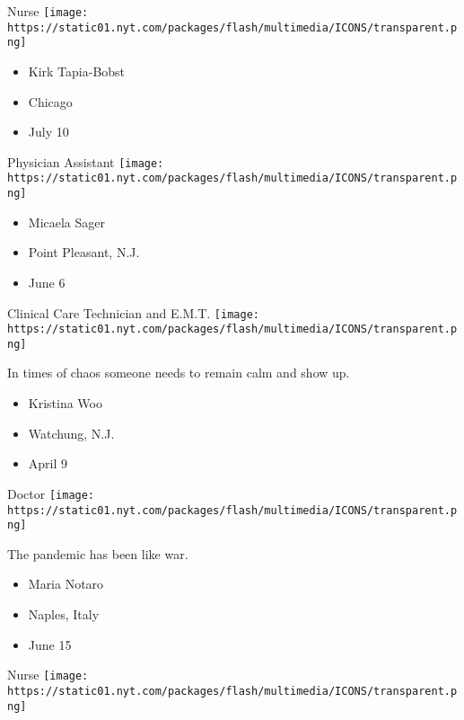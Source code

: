 \protect\hyperlink{item-kirk-tapia-bobst}{}

Nurse
\texttt{[image: https://static01.nyt.com/packages/flash/multimedia/ICONS/transparent.png]}

\begin{itemize}
\tightlist
\item
  Kirk Tapia-Bobst
\item
  Chicago
\item
  July 10
\end{itemize}

\protect\hyperlink{item-micaela-sager}{}

Physician Assistant
\texttt{[image: https://static01.nyt.com/packages/flash/multimedia/ICONS/transparent.png]}

\begin{itemize}
\tightlist
\item
  Micaela Sager
\item
  Point Pleasant, N.J.
\item
  June 6
\end{itemize}

\protect\hyperlink{item-kristina-woo}{}

Clinical Care Technician and E.M.T.
\texttt{[image: https://static01.nyt.com/packages/flash/multimedia/ICONS/transparent.png]}

In times of chaos someone needs to remain calm and show up.

\begin{itemize}
\tightlist
\item
  Kristina Woo
\item
  Watchung, N.J.
\item
  April 9
\end{itemize}

\protect\hyperlink{item-maria-notaro}{}

Doctor
\texttt{[image: https://static01.nyt.com/packages/flash/multimedia/ICONS/transparent.png]}

The pandemic has been like war.

\begin{itemize}
\tightlist
\item
  Maria Notaro
\item
  Naples, Italy
\item
  June 15
\end{itemize}

\protect\hyperlink{item-kp-mendoza}{}

Nurse
\texttt{[image: https://static01.nyt.com/packages/flash/multimedia/ICONS/transparent.png]}

